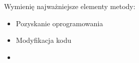 

Wymienię najważniejsze elementy metody:

\begin{itemize}
    \item Pozyskanie oprogramowania
    \item Modyfikacja kodu
    \item
\end{itemize}